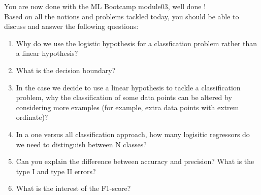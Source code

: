 \documentclass{42-en}
\begin{document}
You are now done with the ML Bootcamp module03, well done !\\
\newline
Based on all the notions and problems
tackled today, you should be able to discuss and answer the following questions:

\begin{enumerate}
  \item Why do we use the logistic hypothesis for a classfication problem 
  rather than a linear hypothesis?
  \item What is the decision boundary?
  \item In the case we decide to use a linear hypothesis to tackle a 
  classification problem, why the classification of some data points can be
   altered by considering more examples (for example, extra data points with extrem ordinate)?
  \item In a one versus all classification approach, how many logisitic regressors do we
   need to distinguish between N classes?
  \item Can you explain the difference between accuracy and precision?
   What is the type I and type II errors?
  \item What is the interest of the F1-score?
\end{enumerate}

\newpage

\end{document}
